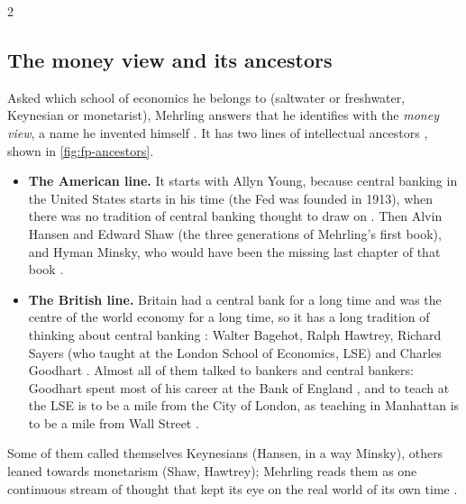 \begin{paracol}{2}
\subsection{The money view and its ancestors}
Asked which school of economics he belongs to (saltwater or freshwater, Keynesian or monetarist),
Mehrling answers that he identifies with the \emph{money view}, a name he invented himself
. It has two lines of intellectual ancestors , shown in
\cref{fig:fp-ancestors}.
\begin{itemize}
  \item \textbf{The American line.} It starts with Allyn Young, because central banking in the United
        States starts in his time (the Fed was founded in 1913), when there was no tradition of central
        banking thought to draw on . Then Alvin Hansen and Edward Shaw (the three
        generations of Mehrling's first book), and Hyman Minsky, who would have been the missing last
        chapter of that book .
  \item \textbf{The British line.} Britain had a central bank for a long time and was the centre of the
        world economy for a long time, so it has a long tradition of thinking about central banking
        : Walter Bagehot, Ralph Hawtrey, Richard Sayers (who taught at the London School of
        Economics, LSE) and Charles Goodhart . Almost all of them talked to bankers and
        central bankers: Goodhart spent most of his career at the Bank of England , and to
        teach at the LSE is to be a mile from the City of London, as teaching in Manhattan is to be a mile
        from Wall Street .
\end{itemize}
Some of them called themselves Keynesians (Hansen, in a way Minsky), others leaned towards monetarism
(Shaw, Hawtrey); Mehrling reads them as one continuous stream of thought that kept its eye on the real
world of its own time .


\end{paracol}
